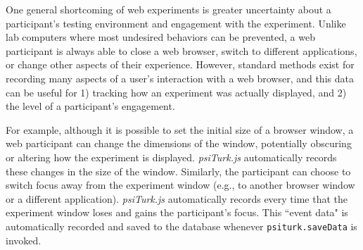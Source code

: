 \documentclass[twocolumn]{svjour3}          %
\begin{document}
One general shortcoming of web experiments is greater uncertainty about a participant's testing environment and engagement with the experiment.
Unlike lab computers where most undesired behaviors can be prevented, a web participant is always able to close a web browser, switch to different applications, or change other aspects of their experience.
However, standard methods exist for recording many aspects of a user's interaction with a web browser, and this data can be useful for 1) tracking how an experiment was actually displayed, and 2) the level of a participant's engagement.

For example, although it is possible to set the initial size of a browser window, a web participant can change the dimensions of the window, potentially obscuring or altering how the experiment is displayed.
\emph{psiTurk.js} automatically records these changes in the size of the window.
Similarly, the participant can choose to switch focus away from the experiment window (e.g., to another browser window or a different application).
\emph{psiTurk.js} automatically records every time that the experiment window loses and gains the participant's focus.
This ``event data" is automatically recorded and saved to the database whenever \texttt{psiturk.saveData} is invoked. \\
\end{document}
